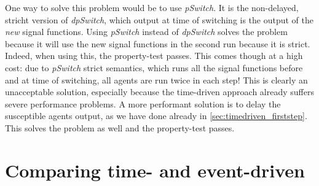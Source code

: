 One way to solve this problem would be to use \textit{pSwitch}. It is the non-delayed, stricht version of \textit{dpSwitch}, which output at time of switching is the output of the \textit{new} signal functions. Using \textit{pSwitch} instead of \textit{dpSwitch} solves the problem because it will use the new signal functions in the second run because it is strict. Indeed, when using this, the property-test passes. This comes though at a high cost: due to \textit{pSwitch} strict semantics, which runs all the signal functions before and at time of switching, all agents are run twice in each step! This is clearly an unacceptable solution, especially because the time-driven approach already suffers severe performance problems. A more performant solution is to delay the susceptible agents output, as we have done already in \ref{sec:timedriven_firststep}. This solves the problem as well and the property-test passes. 

\section{Comparing time- and event-driven}
%
%

